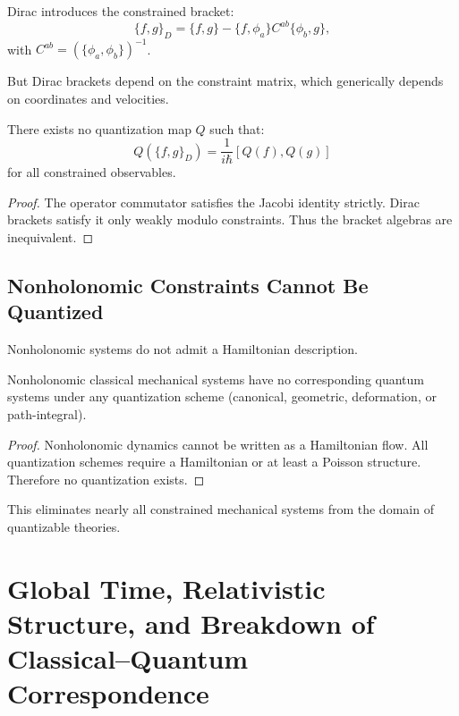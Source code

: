 \documentclass[12pt,oneside]{book}
\begin{document}
Dirac introduces the constrained bracket:
\[
\{f,g\}_D = \{f,g\} - \{f,\phi_a\}C^{ab}\{\phi_b,g\},
\]
with $C^{ab} = (\{\phi_a,\phi_b\})^{-1}$.

But Dirac brackets depend on the constraint matrix, which generically depends on coordinates and velocities.

\begin{theorem}
There exists no quantization map $Q$ such that:
\[
Q(\{f,g\}_D) = \frac{1}{i\hbar}[Q(f),Q(g)]
\]
for all constrained observables.
\end{theorem}

\begin{proof}
The operator commutator satisfies the Jacobi identity strictly.
Dirac brackets satisfy it only weakly modulo constraints.
Thus the bracket algebras are inequivalent.
\end{proof}

\section{Nonholonomic Constraints Cannot Be Quantized}

Nonholonomic systems do not admit a Hamiltonian description.

\begin{theorem}
Nonholonomic classical mechanical systems have no corresponding quantum systems under any quantization scheme (canonical, geometric, deformation, or path-integral).
\end{theorem}

\begin{proof}
Nonholonomic dynamics cannot be written as a Hamiltonian flow.  
All quantization schemes require a Hamiltonian or at least a Poisson structure.  
Therefore no quantization exists.
\end{proof}

This eliminates nearly all constrained mechanical systems from the domain of quantizable theories.




\chapter{Global Time, Relativistic Structure, and Breakdown of Classical–Quantum Correspondence}
\end{document}

